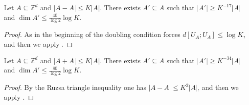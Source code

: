 \begin{theorem}\label{weak-pfr-int}\leanok
Let $A\subseteq \mathbb{Z}^d$ and $\lvert A-A\rvert\leq K\lvert A\rvert$.
There exists $A'\subseteq A$ such that $\lvert A'\rvert \geq K^{-17}\lvert
A\rvert$ and $\dim A' \leq \frac{40}{\log 2}\log K$.
\end{theorem}
\begin{proof}\leanok
{}
As in the beginning of  the doubling condition forces $d[U_A;U_A]\leq \log K$, and then we apply .
\end{proof}

\begin{corollary}\label{weak-pfr-int-sumset}\leanok
Let $A\subseteq \mathbb{Z}^d$ and $\lvert A+A\rvert\leq K\lvert A\rvert$.
There exists $A'\subseteq A$ such that $\lvert A'\rvert \geq K^{-34}\lvert
A\rvert$ and $\dim A' \leq \frac{80}{\log 2}\log K$.
\end{corollary}
\begin{proof}\leanok
{}
By the Ruzsa triangle inequality one has $\lvert A-A\rvert \leq K^2 \lvert A\rvert$, and then we apply .
\end{proof}

